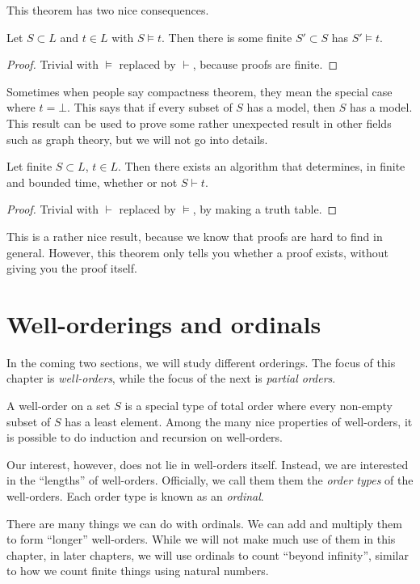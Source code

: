 \documentclass[a4paper]{article}
\begin{document}
This theorem has two nice consequences.
\begin{cor}
  Let $S\subset L$ and $t\in L$ with $S\models t$. Then there is some finite $S'\subset S$ has $S'\models t$.
\end{cor}

\begin{proof}
  Trivial with $\models$ replaced by $\vdash$, because proofs are finite.
\end{proof}
Sometimes when people say compactness theorem, they mean the special case where $t = \bot$. This says that if every subset of $S$ has a model, then $S$ has a model. This result can be used to prove some rather unexpected result in other fields such as graph theory, but we will not go into details.

\begin{cor}
  Let finite $S\subset L$, $t\in L$. Then there exists an algorithm that determines, in finite and bounded time, whether or not $S\vdash t$.
\end{cor}
\begin{proof}
  Trivial with $\vdash$ replaced by $\models$, by making a truth table.
\end{proof}
This is a rather nice result, because we know that proofs are hard to find in general. However, this theorem only tells you whether a proof exists, without giving you the proof itself.

\section{Well-orderings and ordinals}
In the coming two sections, we will study different orderings. The focus of this chapter is \emph{well-orders}, while the focus of the next is \emph{partial orders}.

A well-order on a set $S$ is a special type of total order where every non-empty subset of $S$ has a least element. Among the many nice properties of well-orders, it is possible to do induction and recursion on well-orders.

Our interest, however, does not lie in well-orders itself. Instead, we are interested in the ``lengths'' of well-orders. Officially, we call them them the \emph{order types} of the well-orders. Each order type is known as an \emph{ordinal}.

There are many things we can do with ordinals. We can add and multiply them to form ``longer'' well-orders. While we will not make much use of them in this chapter, in later chapters, we will use ordinals to count ``beyond infinity'', similar to how we count finite things using natural numbers.
\end{document}
